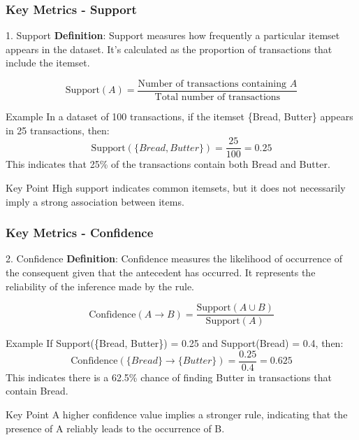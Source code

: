 \documentclass{beamer}
\begin{document}
\begin{frame}[fragile]
    \frametitle{Key Metrics - Support}
    \begin{block}{1. Support}
        \textbf{Definition}: Support measures how frequently a particular itemset appears in the dataset. It's calculated as the proportion of transactions that include the itemset.
    \end{block}
    \begin{equation}
        \text{Support}(A) = \frac{\text{Number of transactions containing } A}{\text{Total number of transactions}}
    \end{equation}
    \begin{block}{Example}
        In a dataset of 100 transactions, if the itemset \{Bread, Butter\} appears in 25 transactions, then:
        \begin{equation}
            \text{Support}(\{Bread, Butter\}) = \frac{25}{100} = 0.25
        \end{equation}
        This indicates that 25\% of the transactions contain both Bread and Butter.
    \end{block}
    \begin{block}{Key Point}
        High support indicates common itemsets, but it does not necessarily imply a strong association between items.
    \end{block}
\end{frame}

\begin{frame}[fragile]
    \frametitle{Key Metrics - Confidence}
    \begin{block}{2. Confidence}
        \textbf{Definition}: Confidence measures the likelihood of occurrence of the consequent given that the antecedent has occurred. It represents the reliability of the inference made by the rule.
    \end{block}
    \begin{equation}
        \text{Confidence}(A \rightarrow B) = \frac{\text{Support}(A \cup B)}{\text{Support}(A)}
    \end{equation}
    \begin{block}{Example}
        If Support(\{Bread, Butter\}) = 0.25 and Support(Bread) = 0.4, then:
        \begin{equation}
            \text{Confidence}(\{Bread\} \rightarrow \{Butter\}) = \frac{0.25}{0.4} = 0.625
        \end{equation}
        This indicates there is a 62.5\% chance of finding Butter in transactions that contain Bread.
    \end{block}
    \begin{block}{Key Point}
        A higher confidence value implies a stronger rule, indicating that the presence of A reliably leads to the occurrence of B.
    \end{block}
\end{frame}
\end{document}
